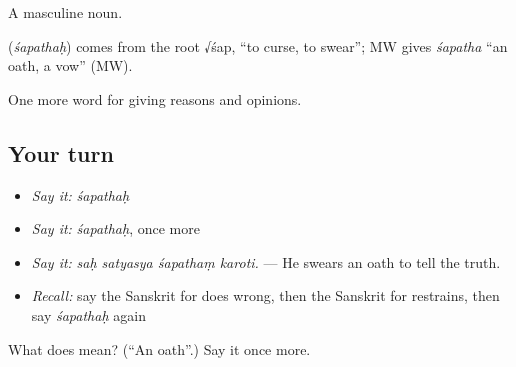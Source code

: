 A masculine noun.

\begin{cousinweb}
\textbf{} (\emph{śapathaḥ}) comes from the root √śap, \textquotedblleft{}to curse, to swear\textquotedblright{}; MW gives \emph{śapatha} \textquotedblleft{}an oath, a vow\textquotedblright{} (MW).
\end{cousinweb}

\begin{grammarlens}[title={What you've built}]
One more word for giving reasons and opinions.
\end{grammarlens}

\subsection*{Your turn}
\begin{itemize}
\raggedright
  \item \emph{Say it:} \emph{śapathaḥ}
  \item \emph{Say it:} \emph{śapathaḥ}, once more
  \item \emph{Say it:} \emph{saḥ satyasya śapathaṃ karoti.} — He swears an oath to tell the truth.
  \item \emph{Recall:} say the Sanskrit for does wrong, then the Sanskrit for restrains, then say \emph{śapathaḥ} again
\end{itemize}

\begin{tcolorbox}[breakable,colback=teal!4,colframe=teal!35!black,title={Before you move on}]
What does  mean? (\textquotedblleft{}An oath\textquotedblright{}.) Say it once more.
\end{tcolorbox}
